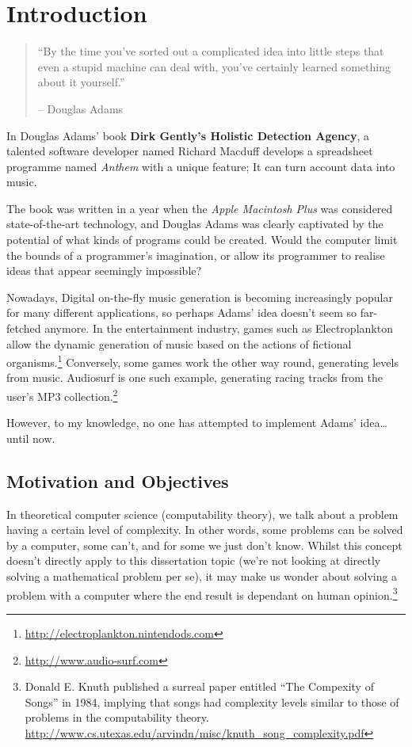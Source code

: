 \chapter{Introduction}
\begin{quote}
``By the time you've sorted out a complicated idea into little steps that even a stupid machine can deal with, you've certainly learned something about it yourself.''\begin{flushright}-- Douglas Adams\end{flushright}
\end{quote}

\noindent In Douglas Adams' book \textbf{Dirk Gently's Holistic Detection Agency}, a talented software developer named Richard Macduff develops a spreadsheet programme named \textit{Anthem} with a unique feature; It can turn account data into music.

The book was written in a year when the \textit{Apple Macintosh Plus} was considered state-of-the-art technology, and Douglas Adams was clearly captivated by the potential of what kinds of programs could be created. Would the computer limit the bounds of a programmer's imagination, or allow its programmer to realise ideas that appear seemingly impossible?

Nowadays, Digital on-the-fly music generation is becoming increasingly popular for many different applications, so perhaps Adams' idea doesn't seem so far-fetched anymore. In the entertainment industry, games such as Electroplankton allow the dynamic generation of music based on the actions of fictional organisms.\footnote{\url{http://electroplankton.nintendods.com}} Conversely, some games work the other way round, generating levels from music. Audiosurf is one such example, generating racing tracks from the user's MP3 collection.\footnote{\url{http://www.audio-surf.com}}

However, to my knowledge, no one has attempted to implement Adams' idea\ldots until now.

\section{Motivation and Objectives}

In theoretical computer science (computability theory), we talk about a problem having a certain level of complexity. In other words, some problems can be solved by a computer, some can't, and for some we just don't know. Whilst this concept doesn't directly apply to this dissertation topic (we're not looking at directly solving a mathematical problem per se), it may make us wonder about solving a problem with a computer where the end result is dependant on human opinion.\footnote{Donald E. Knuth published a surreal paper entitled ``The Compexity of Songs'' in 1984, implying that songs had complexity levels similar to those of problems in the computability theory. \url{http://www.cs.utexas.edu/arvindn/misc/knuth_song_complexity.pdf}}

